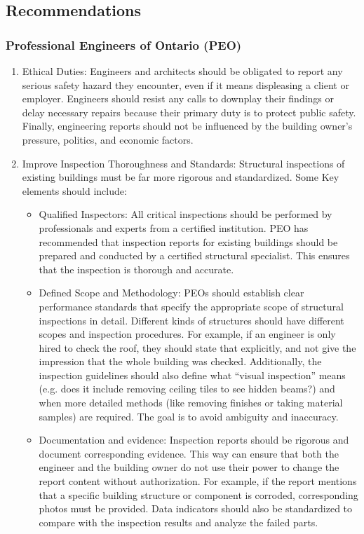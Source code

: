 \documentclass[12pt]{article}
\begin{document}
\subsection{Recommendations}

\subsubsection{Professional Engineers of Ontario (PEO)}
\begin{enumerate}
    \item Ethical Duties: Engineers and architects should be obligated to report any serious safety hazard they encounter, even if it means displeasing a client or employer. Engineers should resist any calls to downplay their findings or delay necessary repairs because their primary duty is to protect public safety. Finally, engineering reports should not be influenced by the building owner’s pressure, politics, and economic factors.
    
    \item Improve Inspection Thoroughness and Standards: Structural inspections of existing buildings must be far more rigorous and standardized. Some Key elements should include:
    \begin{itemize}
        \item Qualified Inspectors: All critical inspections should be performed by professionals and experts from a certified institution. PEO has recommended that inspection reports for existing buildings should be prepared and conducted by a certified structural specialist. This ensures that the inspection is thorough and accurate.
        
        \item Defined Scope and Methodology: PEOs should establish clear performance standards that specify the appropriate scope of structural inspections in detail. Different kinds of structures should have different scopes and inspection procedures. For example, if an engineer is only hired to check the roof, they should state that explicitly, and not give the impression that the whole building was checked. Additionally, the inspection guidelines should also define what “visual inspection” means (e.g. does it include removing ceiling tiles to see hidden beams?) and when more detailed methods (like removing finishes or taking material samples) are required. The goal is to avoid ambiguity and inaccuracy.

        \item Documentation and evidence: Inspection reports should be rigorous and document corresponding evidence. This way can ensure that both the engineer and the building owner do not use their power to change the report content without authorization. For example, if the report mentions that a specific building structure or component is corroded, corresponding photos must be provided. Data indicators should also be standardized to compare with the inspection results and analyze the failed parts.


\end{itemize}
\end{enumerate}
\end{document}
